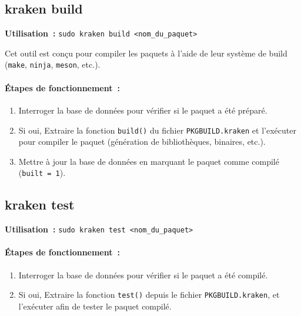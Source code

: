 




\subsection{kraken build}

\textbf{Utilisation :} \texttt{sudo kraken build <nom\_du\_paquet>}

Cet outil est conçu pour compiler les paquets à l’aide de leur système de build (\texttt{make}, \texttt{ninja}, \texttt{meson}, etc.).

\paragraph{Étapes de fonctionnement :}
\begin{enumerate}
    \item Interroger la base de données pour vérifier si le paquet a été préparé.
    \item Si oui,  Extraire la fonction \texttt{build()} du fichier \texttt{PKGBUILD.kraken} et l’exécuter pour compiler le paquet (génération de bibliothèques, binaires, etc.).
    \item Mettre à jour la base de données en marquant le paquet comme compilé (\texttt{built = 1}).
\end{enumerate}







\subsection{kraken test}

\textbf{Utilisation :} \texttt{sudo kraken test <nom\_du\_paquet>}

\paragraph{Étapes de fonctionnement :}
\begin{enumerate}
    \item Interroger la base de données pour vérifier si le paquet a été compilé.
    \item Si oui, Extraire la fonction \texttt{test()} depuis le fichier \texttt{PKGBUILD.kraken}, et l’exécuter afin de tester le paquet compilé.
\end{enumerate}

